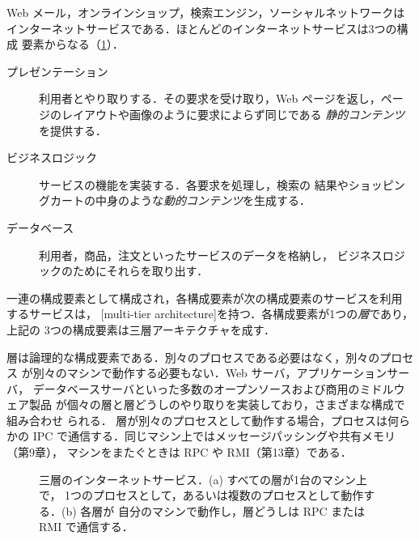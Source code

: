 \documentclass[../main.tex]{subfiles}
\begin{document}
Web メール，オンラインショップ，検索エンジン，ソーシャルネットワークは
インターネットサービスである．ほとんどのインターネットサービスは3つの構成
要素からなる（\cref{fig:l16-tiers}）．
\begin{description}
  \item[プレゼンテーション] 利用者とやり取りする．その要求を受け取り，Web
    ページを返し，ページのレイアウトや画像のように要求によらず同じである
    \emph{静的コンテンツ}を提供する．
  \item[ビジネスロジック] サービスの機能を実装する．各要求を処理し，検索の
    結果やショッピングカートの中身のような\emph{動的コンテンツ}を生成する．
  \item[データベース] 利用者，商品，注文といったサービスのデータを格納し，
    ビジネスロジックのためにそれらを取り出す．
\end{description}

\begin{definition}[多層アーキテクチャ]
  一連の構成要素として構成され，各構成要素が次の構成要素のサービスを利用
  するサービスは，%
  [multi-tier architecture]を持つ．各構成要素が1つの\emph{層}であり，上記の
  3つの構成要素は三層アーキテクチャを成す．
\end{definition}

層は論理的な構成要素である．別々のプロセスである必要はなく，別々のプロセス
が別々のマシンで動作する必要もない．Web サーバ，アプリケーションサーバ，
データベースサーバといった多数のオープンソースおよび商用のミドルウェア製品
が個々の層と層どうしのやり取りを実装しており，さまざまな構成で組み合わせ
られる．%
層が別々のプロセスとして動作する場合，プロセスは何らかの
IPC で通信する．同じマシン上ではメッセージパッシングや共有メモリ（第9章），
マシンをまたぐときは RPC や RMI（第13章）である．

\begin{figure}[htbp]
  \centering
  
  \caption{三層のインターネットサービス．(a) すべての層が1台のマシン上で，
    1つのプロセスとして，あるいは複数のプロセスとして動作する．(b) 各層が
    自分のマシンで動作し，層どうしは RPC または RMI で通信する．}
  \label{fig:l16-tiers}
\end{figure}
\end{document}
